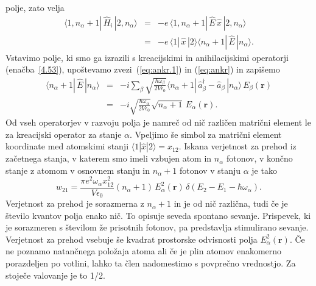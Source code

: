 polje, zato velja 
\begin{eqnarray}
\langle1,n_{\alpha}+1|\,\hat{H}_{i}\,|2,n_{\alpha}\rangle & = & -e\,
\langle1,n_{\alpha}+1|\,\hat{E}\,\hat{x}\,|2,n_{\alpha}\rangle \\
 & = & -e\,\langle1|\,\hat{x}\,|2\rangle\langle n_{\alpha}+1|\,\hat{E}\,|n_{\alpha}\rangle.
\end{eqnarray}
Vstavimo polje, ki smo ga izrazili s kreacijskimi in anihilacijskimi operatorji (enačba~\ref{4.53}),
upoštevamo zvezi~(\ref{eq:ankr.1}) in (\ref{eq:ankr}) in zapišemo
\begin{eqnarray}
\langle n_{\alpha}+1|\, \hat{E}\,|n_{\alpha}\rangle & = 
& -i\sum_{\beta}\sqrt{\frac{\hbar\omega_{\beta}}{2V\epsilon_{0}}}
\langle n_{\alpha}+1|\,\hat{a}_{\beta}^{\dagger}-\hat{a}_{\beta}\,|n_{\alpha}\rangle\, 
E_{\beta}(\mathbf{r})\nonumber \\
 & = & -i\sqrt{\frac{\hbar\omega_{\alpha}}{2V\epsilon_{0}}}
 \sqrt{n_{\alpha}+1}\, E_{\alpha}(\mathbf{r}).
\end{eqnarray}
Od vseh operatorjev v razvoju polja je namreč od nič različen matrični
element le za kreacijski operator za stanje $\alpha$.
Vpeljimo še simbol za matrični element koordinate med 
atomskimi stanji 
$\langle1|\hat{x}|2\rangle=x_{12}$.
 Iskana verjetnost za prehod iz 
začetnega stanja, v katerem smo imeli vzbujen atom in $n_{\alpha}$ fotonov, v končno
stanje z atomom v osnovnem stanju in $n_{\alpha}+1$ fotonov v stanju $\alpha$ je tako
\begin{equation}
w_{21}=\frac{\pi e^{2}\omega_{\alpha}x_{12}^{2}}{V\epsilon_{0}}
(n_{\alpha}+1)\,E_{\alpha}^{2}(\mathbf{r})\,\delta(E_{2}-E_{1}-\hbar\omega_{\alpha}).
\label{4.56}
\end{equation}
Verjetnost za prehod je sorazmerna z $n_{\alpha}+1$ in je od nič
različna, tudi če je število kvantov polja enako nič. To opisuje seveda
spontano sevanje. Prispevek, ki je 
sorazmeren s številom že prisotnih fotonov, pa predstavlja stimulirano 
sevanje. Verjetnost za prehod vsebuje
še kvadrat prostorske odvisnosti polja $E_{\alpha}^{2}(\mathbf{r})$.
Če ne poznamo natančnega položaja atoma ali če je plin atomov enakomerno
porazdeljen po votlini, lahko ta člen nadomestimo s povprečno vrednostjo.
Za stoječe valovanje je to 1/2.

